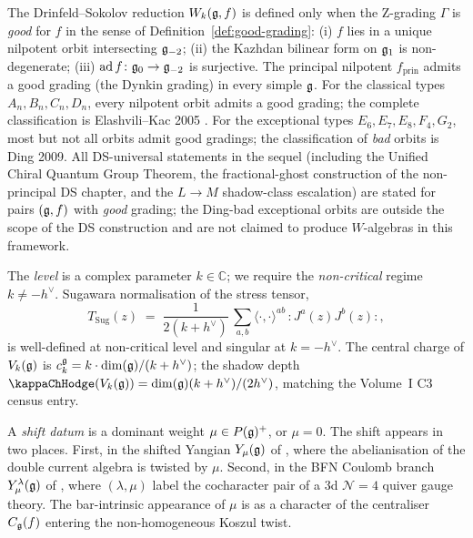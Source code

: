 \begin{remark}
\label{rem:ds-good-grading-scope-unified-chiral-qg}
The Drinfeld--Sokolov reduction $W_k(\mathfrak{g}, f)$ is defined only when
the Z-grading $\Gamma$ is \emph{good} for $f$ in the sense of
Definition~\ref{def:good-grading}: (i) $f$ lies in a unique nilpotent
orbit intersecting $\mathfrak{g}_{-2}$; (ii) the Kazhdan bilinear form on
$\mathfrak{g}_1$ is non-degenerate; (iii) $\mathrm{ad}\,f\colon \mathfrak{g}_0 \to
\mathfrak{g}_{-2}$ is surjective. The principal nilpotent $f_{\mathrm{prin}}$
admits a good grading (the Dynkin grading) in every simple $\mathfrak{g}$. For
the classical types $A_n, B_n, C_n, D_n$, every nilpotent orbit admits
a good grading; the complete classification is Elashvili--Kac 2005
\cite{ElashviliKac05}. For the exceptional types $E_6, E_7, E_8, F_4,
G_2$, most but not all orbits admit good gradings; the classification
of \emph{bad} orbits is Ding 2009. All DS-universal statements in the
sequel (including the Unified Chiral Quantum Group Theorem, the
fractional-ghost construction of the non-principal DS chapter, and the $L\to M$
shadow-class escalation) are stated for pairs $(\mathfrak{g}, f)$ with
\emph{good} grading; the Ding-bad exceptional orbits are outside the
scope of the DS construction and are not claimed to produce
$W$-algebras in this framework.
\end{remark}

\begin{definition}
\label{def:level-noncrit}
The \emph{level} is a complex parameter $k\in\mathbb{C}$; we require
the \emph{non-critical} regime $k\neq -h^{\vee}$. Sugawara
normalisation of the stress tensor,
\[
 T_{\mathrm{Sug}}(z) \;=\; \frac{1}{2(k+h^{\vee})}\,
 \sum_{a,b} \langle\cdot,\cdot\rangle^{ab}\,
 {:}J^{a}(z) J^{b}(z){:},
\]
is well-defined at non-critical level and singular at $k = -h^{\vee}$.
The central charge of $V_k(\mathfrak{g})$ is
$c_{k}^{\mathfrak{g}} = k\cdot \dim(\mathfrak{g})/(k+h^{\vee})$; the shadow depth
$\kappaChHodge(V_k(\fg)) = \dim(\fg)(k+h^{\vee})/(2h^{\vee})$, matching the
Volume~I C3 census entry.
\end{definition}

\begin{definition}
\label{def:shift-datum}
A \emph{shift datum} is a dominant weight $\mu \in P(\mathfrak{g})^{+}$, or
$\mu = 0$. The shift appears in two places. First, in the shifted
Yangian $Y_{\mu}(\mathfrak{g})$ of \cite{BrundanKleshchev06,KamnitzerTappeWeekes14},
where the abelianisation of the double current algebra is twisted by
$\mu$. Second, in the BFN Coulomb branch
$Y^{\lambda}_{\mu}(\mathfrak{g})$ of \cite{BFN19a}, where $(\lambda, \mu)$
label the cocharacter pair of a 3d $\mathcal{N}=4$ quiver gauge theory.
The bar-intrinsic appearance of $\mu$ is as a character of the
centraliser $C_{\mathfrak{g}}(f)$ entering the non-homogeneous Koszul twist.
\end{definition}

